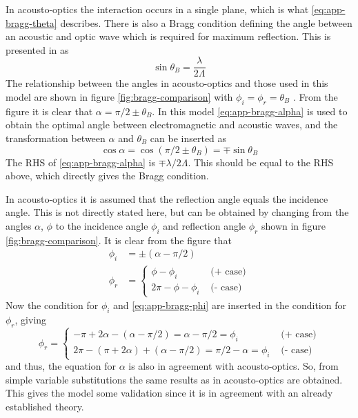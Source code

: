 \documentclass[11pt,twoside]{eitExjobb}
\begin{document}
	In acousto-optics the interaction occurs in a single plane, which is what \eqref{eq:app-bragg-theta} describes. There is also a Bragg condition defining the angle between an acoustic and optic wave which is required for maximum reflection. This is presented in \cite{Saleh2007} as
	\begin{equation*}
		\sin{\theta_B} = \frac{\lambda}{2\Lambda}
	\end{equation*}
	The relationship between the angles in acousto-optics and those used in this model are shown in figure \ref{fig:bragg-comparison} with $\phi_i = \phi_r = \theta_B$ \cite{Saleh2007}. From the figure it is clear that $\alpha = \pi/2 \pm \theta_B$. In this model \eqref{eq:app-bragg-alpha} is used to obtain the optimal angle between electromagnetic and acoustic waves, and the transformation between $\alpha$ and $\theta_B$ can be inserted as
	\begin{equation*}
		\cos{\alpha} = \cos(\pi/2 \pm \theta_B) = \mp \sin{\theta_B}
	\end{equation*}
	The RHS of \eqref{eq:app-bragg-alpha} is $\mp \lambda/2\Lambda$. This should be equal to the RHS above, which directly gives the Bragg condition.
	
	In acousto-optics it is assumed that the reflection angle equals the incidence angle. This is not directly stated here, but can be obtained by changing from the angles $\alpha$, $\phi$ to the incidence angle $\phi_i$ and reflection angle $\phi_r$ shown in figure \ref{fig:bragg-comparison}. It is clear from the figure that
	\begin{align*}
		\phi_i &= \pm(\alpha - \pi/2) \\
		\phi_r &=
		\begin{cases}
			\phi - \phi_i &\text{ (+ case)} \\
			2\pi - \phi - \phi_i &\text{ (- case)}
		\end{cases}
	\end{align*}
	Now the condition for $\phi_i$ and \eqref{eq:app-bragg-phi} are inserted in the condition for $\phi_r$, giving
	\begin{equation*}
		\phi_r =
		\begin{cases}
			-\pi + 2\alpha - (\alpha - \pi/2) = \alpha - \pi/2 = \phi_i &\text{ (+ case)}\\
			2\pi - (\pi + 2\alpha) + (\alpha - \pi/2) = \pi/2 - \alpha = \phi_i &\text{ (- case)}
		\end{cases}
	\end{equation*}
	and thus, the equation for $\alpha$ is also in agreement with acousto-optics. So, from simple variable substitutions the same results as in acousto-optics are obtained. This gives the model some validation since it is in agreement with an already established theory.
	
\end{document}
